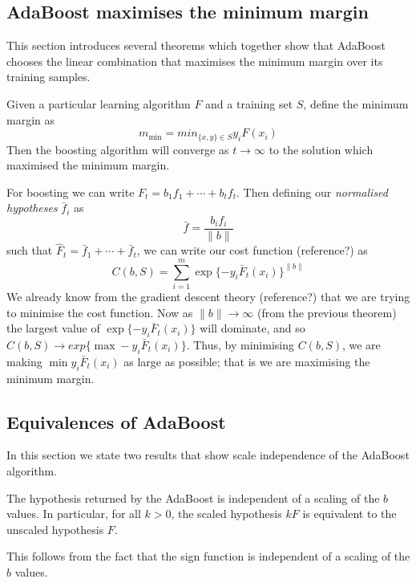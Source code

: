 \subsection{AdaBoost maximises the minimum margin}

This section introduces several theorems which together show that
AdaBoost chooses the linear combination that maximises the minimum
margin over its training samples.

\begin{theorem}
Given a particular learning algorithm $F$ and a training
set $S$, define the minimum margin as
\[
m_{\min} = min_{\{x,y\} \in S} y_i F(x_i)
\]
Then the boosting algorithm will converge as $t \rightarrow \infty$ to
the solution which maximised the minimum margin.

\proof For boosting we can write $F_t = b_1 f_1 + \cdots + b_t f_t$.
Then defining our \emph{normalised hypotheses} $\bar{f}_i$ as
\[
\bar{f} = \frac{b_i f_i}{\|b\|}
\]
such that $\hat{F}_t = \bar{f}_1 + \cdots + \bar{f}_t$, we can write
our cost function (reference?) as 
\[
C(b, S) = \sum_{i=1}^{m} \exp\{-y_i \bar{F}_t(x_i)\}^{\|b\|}
\]
We already know from the gradient descent theory (reference?) that we
are trying to minimise the cost function.  Now as $\|b\| \rightarrow
\infty$ (from the previous theorem) the largest value of $\exp\{-y_i
\bar{F}_t(x_i)\}$ will dominate, and so $C(b, S) \rightarrow exp\{\max
-y_i \bar{F}_t(x_i)\}$.  Thus, by minimising $C(b, S)$, we are making
$\min y_i \bar{F}_t(x_i)$ as large as possible; that is we are
maximising the minimum margin.
\end{theorem}


\subsection{Equivalences of AdaBoost}

In this section we state two results that show scale independence of
the AdaBoost algorithm.

\begin{theorem}
The hypothesis returned by the AdaBoost is independent of a 
scaling of the $b$ values.  In particular, for all $k > 0$, the
scaled hypothesis $kF$ is equivalent to the unscaled hypothesis $F$.

\proof This follows from the fact that the sign function is
independent of a scaling of the $b$ values.
\end{theorem}


